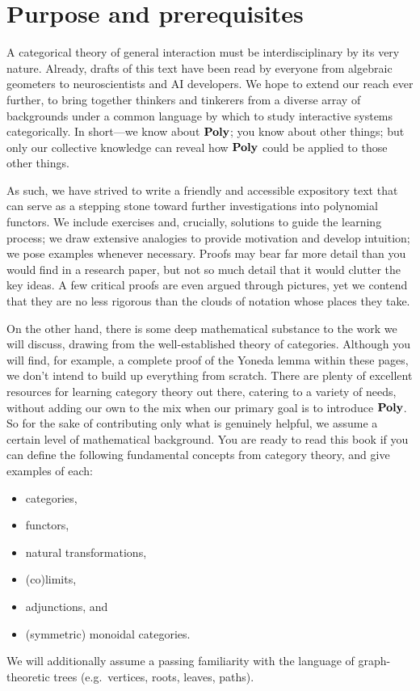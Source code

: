 \documentclass[Book-Poly]{subfiles}
\begin{document}
\section*{Purpose and prerequisites}

A categorical theory of general interaction must be interdisciplinary by its very nature.
Already, drafts of this text have been read by everyone from algebraic geometers to neuroscientists and AI developers.
We hope to extend our reach ever further, to bring together thinkers and tinkerers from a diverse array of backgrounds under a common language by which to study interactive systems categorically.
In short---we know about $\mathbf{Poly}$; you know about other things; but only our collective knowledge can reveal how $\mathbf{Poly}$ could be applied to those other things.

As such, we have strived to write a friendly and accessible expository text that can serve as a stepping stone toward further investigations into polynomial functors.
We include exercises and, crucially, solutions to guide the learning process; we draw extensive analogies to provide motivation and develop intuition; we pose examples whenever necessary.
Proofs may bear far more detail than you would find in a research paper, but not so much detail that it would clutter the key ideas.
A few critical proofs are even argued through pictures, yet we contend that they are no less rigorous than the clouds of notation whose places they take.

On the other hand, there is some deep mathematical substance to the work we will discuss, drawing from the well-established theory of categories.
Although you will find, for example, a complete proof of the Yoneda lemma within these pages, we don't intend to build up everything from scratch.
There are plenty of excellent resources for learning category theory out there, catering to a variety of needs, without adding our own to the mix when our primary goal is to introduce $\mathbf{Poly}$.
So for the sake of contributing only what is genuinely helpful, we assume a certain level of mathematical background.
You are ready to read this book if you can define the following fundamental concepts from category theory, and give examples of each:
\begin{itemize}
    \item categories,
    \item functors,
    \item natural transformations,
    \item (co)limits,
    \item adjunctions, and
    \item (symmetric) monoidal categories.
\end{itemize}
We will additionally assume a passing familiarity with the language of graph-theoretic trees (e.g.\ vertices, roots, leaves, paths).
\end{document}
